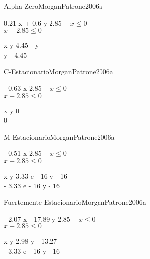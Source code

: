 
\begin{bilevelmodel}{Alpha-Zero}{MorganPatrone2006a}
    \begin{upperlevel}{0.21 x + 0.6 y}{
        $2.85 - x \leq 0$\\ 
$x - 2.85 \leq 0$
    }
    \end{upperlevel}
    \begin{lowerlevel}{x y}{
         4.45 - y  \\ 
 y - 4.45 
    }
    \end{lowerlevel}
\end{bilevelmodel}
    
        


\begin{bilevelmodel}{C-Estacionario}{MorganPatrone2006a}
    \begin{upperlevel}{- 0.63 x}{
        $2.85 - x \leq 0$\\ 
$x - 2.85 \leq 0$
    }
    \end{upperlevel}
    \begin{lowerlevel}{x y}{
         0  \\ 
 0 
    }
    \end{lowerlevel}
\end{bilevelmodel}
    
        

\begin{bilevelmodel}{M-Estacionario}{MorganPatrone2006a}
    \begin{upperlevel}{- 0.51 x}{
        $2.85 - x \leq 0$\\ 
$x - 2.85 \leq 0$
    }
    \end{upperlevel}
    \begin{lowerlevel}{x y}{
         3.33 e - 16 y - 16  \\ 
 - 3.33 e - 16 y - 16 
    }
    \end{lowerlevel}
\end{bilevelmodel}
    
        

\begin{bilevelmodel}{Fuertemente-Estacionario}{MorganPatrone2006a}
    \begin{upperlevel}{- 2.07 x - 17.89 y}{
        $2.85 - x \leq 0$\\ 
$x - 2.85 \leq 0$
    }
    \end{upperlevel}
    \begin{lowerlevel}{x y}{
         2.98 y - 13.27  \\ 
 - 3.33 e - 16 y - 16 
    }
    \end{lowerlevel}
\end{bilevelmodel}
    
        

